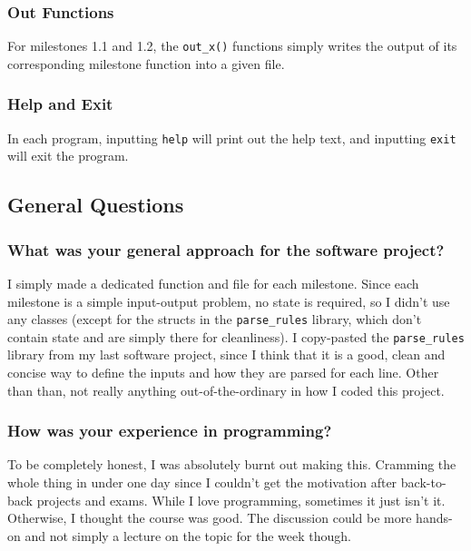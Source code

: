 \documentclass{article}
\begin{document}
			\subsubsection{Out Functions}
				For milestones 1.1 and 1.2, the \verb|out_x()| functions simply writes the output of its corresponding milestone function into a given file.

			\subsubsection{Help and Exit}
				In each program, inputting \verb|help| will print out the help text, and inputting \verb|exit| will exit the program.

			\pagebreak



		\subsection{General Questions}
			\subsubsection{What was your general approach for the software project?}
				I simply made a dedicated function and file for each milestone. Since each milestone is a simple input-output problem,
				no state is required, so I didn't use any classes (except for the structs in the \verb|parse_rules| library, which
				don't contain state and are simply there for cleanliness). I copy-pasted the \verb|parse_rules| library from my last
				software project, since I think that it is a good, clean and concise way to define the inputs and how they are parsed
				for each line. Other than than, not really anything out-of-the-ordinary in how I coded this project.

			\subsubsection{How was your experience in programming?}
				To be completely honest, I was absolutely burnt out making this. Cramming the whole thing in under one day since I couldn't
				get the motivation after back-to-back projects and exams. While I love programming, sometimes it just isn't it. Otherwise,
				I thought the course was good. The discussion could be more hands-on and not simply a lecture on the topic for the week though.
\end{document}
